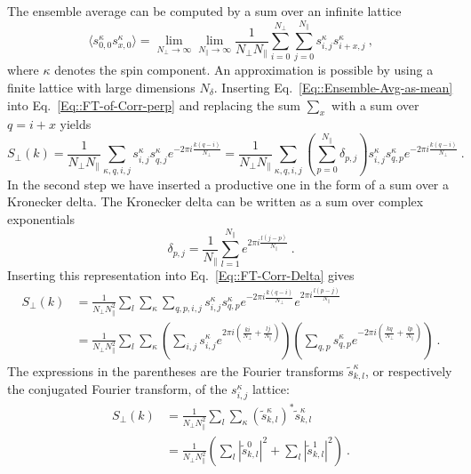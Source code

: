 	The ensemble average can be computed by a sum over an infinite lattice
	\begin{equation} \label{Eq::Ensemble-Avg-as-mean}
		\langle s^\kappa_{0,0} s_{x, 0}^\kappa \rangle =	\lim\limits_{N_\perp \rightarrow \infty} \lim\limits_{N_\parallel \rightarrow \infty} \frac{1}{N_\perp N_\parallel} \sum_{i =	0}^{N_\perp} \sum_{j=0}^{N_\parallel}   s^\kappa_{i,j} s_{i + x, j}^\kappa~,
	\end{equation}
	where $\kappa$ denotes the spin component. An approximation is possible by using a finite lattice with large dimensions $N_\delta$. Inserting Eq.~\eqref{Eq::Ensemble-Avg-as-mean} into Eq.~\eqref{Eq::FT-of-Corr-perp} and replacing the sum $\sum_x$ with a sum over $q =	i +x$ yields
	\begin{equation} \label{Eq::FT-Corr-Delta}
		S_\perp(k) = \frac{1}{N_\perp N_\parallel}  \sum_{\kappa,q,i,j}^{}   s^\kappa_{i,j} s_{q, j}^\kappa e^{-2\pi i \frac{k(q-i)}{N_\perp}} =	\frac{1}{N_\perp N_\parallel}  \sum_{\kappa,q,i,j}^{}  \left(\sum_{p=0}^{N_\parallel} \delta_{p,j} \right) s^\kappa_{i,j} s_{q, p}^\kappa e^{-2\pi i \frac{k(q-i)}{N_\perp}}~.
	\end{equation}
	In the second step we have inserted a productive one in the form of  a sum over a Kronecker delta. The Kronecker delta can be written as a sum over complex exponentials
	\begin{equation}
		\delta_{p,j} =	\frac{1}{N_\parallel} \sum_{l=1}^{N_\parallel} e^{2 \pi i \frac{l(j - p)}{N_\parallel}}~.
	\end{equation}
	Inserting this representation into Eq.~\eqref{Eq::FT-Corr-Delta} gives
	\begin{equation}
		\begin{split}
			S_\perp(k) &=	\frac{1}{N_\perp N_\parallel^2} \sum_l \sum_\kappa \sum_{q,p,i,j} s^\kappa_{i,j} s_{q, p}^\kappa e^{-2\pi i \frac{k(q-i)}{N_\perp}} e^{2 \pi i \frac{l(p - j)}{N_\parallel}} \\
			&=	\frac{1}{N_\perp N_\parallel^2} \sum_l \sum_\kappa \left(\sum_{i,j} s^\kappa_{i,j} e^{2\pi i \left(\frac{ki}{N_\perp} + \frac{lj}{N_\parallel} \right)} \right) \left(\sum_{q,p} s_{q, p}^\kappa e^{-2 \pi i \left( \frac{kq}{N_\perp} + \frac{lp}{N_\parallel} \right)} \right)~.
		\end{split}
	\end{equation}
	The expressions in the parentheses are the Fourier transforms $\tilde{s}_{k,l}^\kappa$, or respectively the conjugated Fourier transform, of the $s_{i,j}^\kappa$ lattice:
	\begin{equation} \label{Eq::S-as-lattice-FT}
		\begin{split}
			S_\perp(k) &=	\frac{1}{N_\perp N_\parallel^2} \sum_l \sum_\kappa \left(\tilde{s}_{k,l}^\kappa\right)^* \tilde{s}_{k,l}^\kappa \\
			&= \frac{1}{N_\perp N_\parallel^2} \left( \sum_l |\tilde{s}_{k,l}^0|^2  + \sum_l |\tilde{s}_{k,l}^1|^2\right)~.
		\end{split}
	\end{equation}
